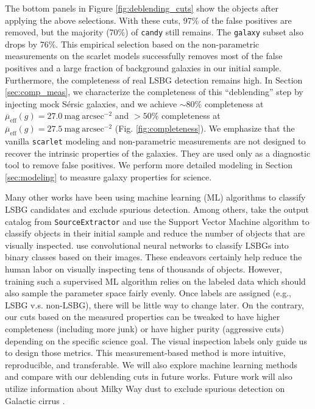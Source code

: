 \documentclass[twocolumn,astrosymb,twocolappendix]{aastex631}
\newcommand{\sbunit}{\mathrm{mag\ arcsec}^{-2}}
\newcommand{\sbeff}{\overline{\mu}_{\mathrm{eff}}(g)}
\newcommand{\code}[1]{\texttt{#1}}
\newcommand{\sersic}{S\'ersic}
\begin{document}
\begin{CJK*}{UTF8}{gbsn}
The bottom panels in Figure \ref{fig:deblending_cuts} show the objects after applying the above selections. With these cuts, 97\% of the false positives are removed, but the majority (70\%) of \code{candy} still remains. The \code{galaxy} subset also drops by 76\%. This empirical selection based on the non-parametric measurements on the scarlet models successfully removes most of the false positives and a large fraction of background galaxies in our initial sample. Furthermore, the completeness of real LSBG detection remains high. In Section \ref{sec:comp_meas}, we characterize the completeness of this ``deblending'' step by injecting mock \sersic{} galaxies, and we achieve $\sim80\%$ completeness at $\sbeff = 27.0\ \sbunit$ and $>50\%$ completeness at $\sbeff = 27.5\ \sbunit$ (Fig. \ref{fig:completeness}). We emphasize that the vanilla \code{scarlet} modeling and non-parametric measurements are not designed to recover the intrinsic properties of the galaxies. They are used only as a diagnostic tool to remove false positives. We perform more detailed modeling in Section \ref{sec:modeling} to measure galaxy properties for science. 


Many other works have been using machine learning (ML) algorithms to classify LSBG candidates and exclude spurious detection. Among others, \citet{Tanoglidis2021} take the output catalog from \code{SourceExtractor} and use the Support Vector Machine algorithm to classify objects in their initial sample and reduce the number of objects that are visually inspected. \citet{Zaritsky2019,Zaritsky2021,Zaritsky2022} use convolutional neural networks to classify LSBGs into binary classes based on their images. These endeavors certainly help reduce the human labor on visually inspecting tens of thousands of objects. However, training such a supervised ML algorithm relies on the labeled data which should also sample the parameter space fairly evenly. Once labels are assigned (e.g., LSBG v.s. non-LSBG), there will be little way to change later. On the contrary, our cuts based on the measured properties can be tweaked to have higher completeness  (including more junk) or have higher purity (aggressive cuts) depending on the specific science goal. The visual inspection labels only guide us to design those metrics. This measurement-based method is more intuitive, reproducible, and transferable. We will also explore machine learning methods and compare with our deblending cuts in future works. Future work will also utilize information about Milky Way dust to exclude spurious detection on Galactic cirrus \citep[e.g.,][]{Zaritsky2021,Zaritsky2022}.


\end{CJK*}
\end{document}
